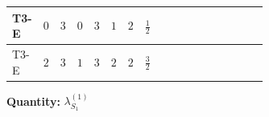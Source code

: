 \documentclass[8pt]{article}
\begin{document}
\begin{landscape}
\begin{longtable}{@{}llcccccc >{\raggedright\arraybackslash}p{0.21\linewidth} >{\raggedright\arraybackslash}p{0.21\linewidth} >{\raggedright\arraybackslash}p{0.21\linewidth}@{}}
\midrule
T3-E & $0$ & $3$ & $0$ & $3$ & $1$ & $2$ & $\frac{1}{2}$ & \scriptsize\adjustbox{max width=\linewidth}{$\begin{gathered} +\frac{3 {\lambda_{HS_1}^{(A)}}^2}{2}\end{gathered}$} & \scriptsize\adjustbox{max width=\linewidth}{$\begin{gathered} +26 {\lambda_{S_1}^{(A)}}^2\end{gathered}$} & \scriptsize\adjustbox{max width=\linewidth}{$\begin{gathered} +8 {\lambda_{12}^{(1)}} {\lambda_{12}^{(\times)}}\end{gathered}$} \\
\midrule
T3-E & $2$ & $3$ & $1$ & $3$ & $2$ & $2$ & $\frac{3}{2}$ & \scriptsize\adjustbox{max width=\linewidth}{$\begin{gathered} +\frac{3 {\lambda_{HS_1}^{(A)}}^2}{2}\end{gathered}$} & \scriptsize\adjustbox{max width=\linewidth}{$\begin{gathered} +26 {\lambda_{S_1}^{(A)}}^2\end{gathered}$} & \scriptsize\adjustbox{max width=\linewidth}{$\begin{gathered} +8 {\lambda_{12}^{(1)}} {\lambda_{12}^{(\times)}}\end{gathered}$} \\
\midrule
\bottomrule
\end{longtable}
\clearpage
\noindent\textbf{Quantity: }$\lambda_{S_1}^{(1)}$\par\smallskip

\end{landscape}
\end{document}
